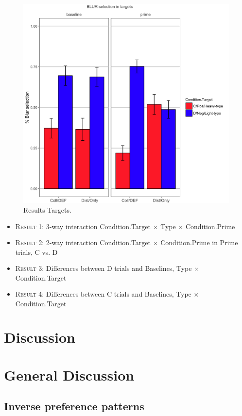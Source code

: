\documentclass[a4paper]{article}
\begin{document}
\begin{figure}
    \centering
    \includegraphics[width=.6\textwidth]{BLUR_targets-HOI.png}
    \caption{Results Targets.}\label{fig:target.results}
\end{figure}



\begin{itemize}
\item \textsc{Result 1:} 3-way interaction Condition.Target $\times$ Type $\times$ Condition.Prime
\item \textsc{Result 2:} 2-way interaction Condition.Target $\times$ Condition.Prime in Prime trials, C vs. D
\item  \textsc{Result 3:} Differences between D trials and Baselines, Type $\times$ Condition.Target 
\item  \textsc{Result 4:} Differences between C trials and Baselines, Type $\times$ Condition.Target 
\end{itemize}

\section{Discussion}

\section{General Discussion}
\subsection{Inverse preference patterns}
\end{document}
